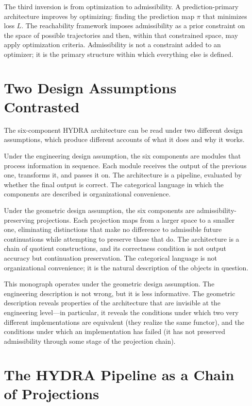 \documentclass[12pt, oneside]{book}
\theoremstyle{flyxion}
\theoremstyle{definition}
\begin{document}
The third inversion is from optimization to admissibility. A
prediction-primary architecture improves by optimizing: finding the
prediction map $\pi$ that minimizes loss $L$. The reachability
framework imposes admissibility as a prior constraint on the space of
possible trajectories and then, within that constrained space, may
apply optimization criteria. Admissibility is not a constraint added
to an optimizer; it is the primary structure within which everything
else is defined.

\section{Two Design Assumptions Contrasted}

The six-component HYDRA architecture can be read under two different
design assumptions, which produce different accounts of what it does
and why it works.

Under the engineering design assumption, the six components are modules
that process information in sequence. Each module receives the output
of the previous one, transforms it, and passes it on. The architecture
is a pipeline, evaluated by whether the final output is correct. The
categorical language in which the components are described is
organizational convenience.

Under the geometric design assumption, the six components are
admissibility-preserving projections. Each projection maps from a
larger space to a smaller one, eliminating distinctions that make no
difference to admissible future continuations while attempting to
preserve those that do. The architecture is a chain of quotient
constructions, and its correctness condition is not output accuracy
but continuation preservation. The categorical language is not
organizational convenience; it is the natural description of the
objects in question.

This monograph operates under the geometric design assumption. The
engineering description is not wrong, but it is less informative. The
geometric description reveals properties of the architecture that are
invisible at the engineering level---in particular, it reveals the
conditions under which two very different implementations are
equivalent (they realize the same functor), and the conditions under
which an implementation has failed (it has not preserved admissibility
through some stage of the projection chain).

\section{The HYDRA Pipeline as a Chain of Projections}
\end{document}
